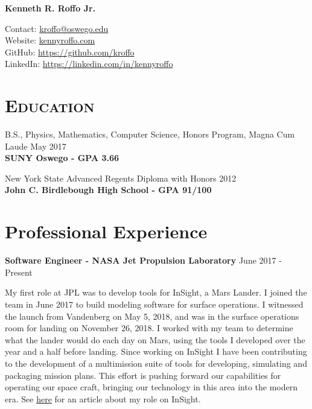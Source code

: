 \documentclass[8pt]{article}
\def\name{Kenneth R. Roffo Jr.}
\renewenvironment{itemize}{
  \begin{list}{}{
    \setlength{\leftmargin}{1.5em}
  }
}{
  \end{list}
}
\begin{document}
{\huge \bf \name}


Contact: \href{mailto:kroffo@oswego.edu}{kroffo@oswego.edu}\\
Website: \href{http://kennyroffo.com}{kennyroffo.com}\\
GitHub: \href{https://github.com/kroffo}{https://github.com/kroffo}\\
LinkedIn: \href{https://www.linkedin.com/in/kennyroffo}{https://linkedin.com/in/kennyroffo}

\section*{\textsc{Education}}

\begin{itemize}
  \item B.S., Physics, Mathematics, Computer Science, Honors Program, Magna Cum Laude \hfill May 2017\\
  \textbf{SUNY Oswego - GPA 3.66}
  \item New York State Advanced Regents Diploma with Honors \hfill 2012\\
  \textbf{John C. Birdlebough High School - GPA 91/100}
  \end{itemize}


\section*{Professional Experience}
\textbf{Software Engineer - NASA Jet Propulsion Laboratory} \hfill June 2017 - Present

My first role at JPL was to develop tools for InSight, a Mars Lander. I joined the team in June 2017 to build modeling software for surface operations. I witnessed the launch from Vandenberg on May 5, 2018, and was in the surface operations room for landing on November 26, 2018. I worked with my team to determine what the lander would do each day on Mars, using the tools I developed over the year and a half before landing. Since working on InSight I have been contributing to the development of a multimission suite of tools for developing, simulating and packaging mission plans. This effort is pushing forward our capabilities for operating our space craft, bringing our technology in this area into the modern era. See \href{http://www.oswegocountynewsnow.com/news/mars-landing-puts-phoenix-native-suny-oswego-grad-roffo-among/article_968bd574-f34c-11e8-8c5b-b7d557e9f682.html?fbclid=IwAR1iCW3CdQIRr2JIy1f96utXjzzidSJ6vA13jVgvkjKIU6PopaLHYkpbQrw}{here} for an article about my role on InSight.
\end{document}
